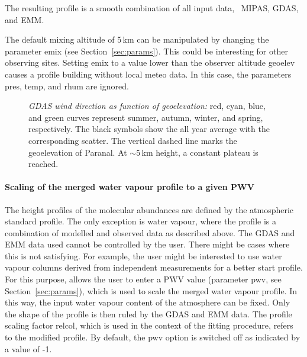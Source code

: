 The resulting profile is a smooth combination of all input data, \ie\ MIPAS,
\ac{GDAS}, and \ac{EMM}.

The default mixing altitude of 5\,km can be manipulated by changing the
parameter {\sc emix} (see Section~\ref{sec:params}). This could be interesting
for other observing sites. Setting {\sc emix} to a value lower than the
observer altitude {\sc geoelev} causes a profile building without local meteo
data. In this case, the parameters {\sc pres}, {\sc temp}, and {\sc rhum} are
ignored.

\begin{figure}[ht]
  \begin{center}
    \caption{{\it \ac{GDAS} wind direction as function of geoelevation:} red,
cyan, blue, and green curves represent summer, autumn, winter, and spring,
respectively. The black symbols show the all year average with the
corresponding scatter. The vertical dashed line marks the geoelevation of
Paranal. At $\sim 5\,$km height, a constant plateau is reached.}
    \label{fig:gdas_wind}
  \end{center}
\end{figure}

\paragraph*{Scaling of the merged water vapour profile to a given PWV}
\label{sec:pwv_scaling}
The height profiles of the molecular abundances are defined by the atmospheric
standard profile. The only exception is water vapour, where the profile is a
combination of modelled and observed data as described above. The \ac{GDAS} and
\ac{EMM} data used cannot be controlled by the user. There might be cases where
this is not satisfying. For example, the user might be interested to use water
vapour columns derived from independent measurements for a better start
profile. For this purpose, \mf{} allows the user to enter a \ac{PWV} value
(parameter {\sc pwv}, see Section~\ref{sec:params}), which is used to scale the
merged water vapour profile. In this way, the input water vapour content of the
atmosphere can be fixed. Only the shape of the profile is then ruled by the
\ac{GDAS} and \ac{EMM} data. The profile scaling factor {\sc relcol}, which
is used in the context of the fitting procedure, refers to the modified
profile. By default, the {\sc pwv} option is switched off as indicated by a
value of -1.

